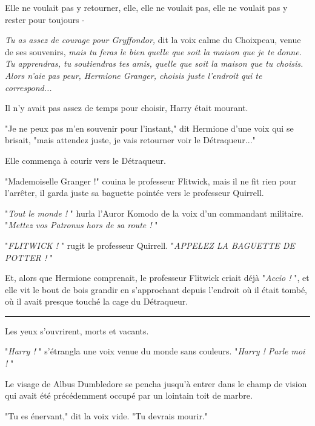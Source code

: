 Elle ne voulait pas y retourner, elle, elle ne voulait pas, elle ne voulait pas y rester pour toujours -

\emph{Tu as assez de courage pour Gryffondor,}  dit la voix calme du Choixpeau, venue de ses souvenirs, \emph{mais tu feras le bien quelle que soit la maison que je te donne. Tu apprendras, tu soutiendras tes amis, quelle que soit la maison que tu choisis. Alors n'aie pas peur, Hermione Granger, choisis juste l'endroit qui te correspond...} 

Il n'y avait pas assez de temps pour choisir, Harry était mourant.

"Je ne peux pas m'en souvenir pour l'instant," dit Hermione d'une voix qui se brisait, "mais attendez juste, je vais retourner voir le Détraqueur..."

Elle commença à courir vers le Détraqueur.

"Mademoiselle Granger !" couina le professeur Flitwick, mais il ne fit rien pour l'arrêter, il garda juste sa baguette pointée vers le professeur Quirrell.

"\emph{Tout le monde !} " hurla l'Auror Komodo de la voix d'un commandant militaire. "\emph{Mettez vos Patronus hors de sa route !} "

"\emph{FLITWICK !} " rugit le professeur Quirrell. "\emph{APPELEZ LA BAGUETTE DE POTTER !} "

Et, alors que Hermione comprenait, le professeur Flitwick criait déjà "\emph{Accio !} ", et elle vit le bout de bois grandir en s'approchant depuis l'endroit où il était tombé, où il avait presque touché la cage du Détraqueur.
\par\noindent\rule{\textwidth}{0.4pt}
Les yeux s'ouvrirent, morts et vacants.

"\emph{Harry !} " s'étrangla une voix venue du monde sans couleurs. "\emph{Harry ! Parle moi !} "

Le visage de Albus Dumbledore se pencha jusqu'à entrer dans le champ de vision qui avait été précédemment occupé par un lointain toit de marbre.

"Tu es énervant," dit la voix vide. "Tu devrais mourir."

